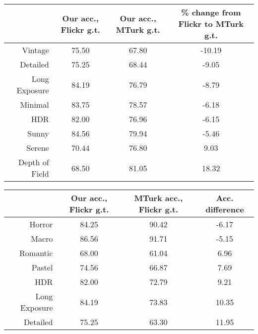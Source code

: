 \vfill

\begin{tabular}{rccc}
\toprule
{}                    & Our acc., Flickr g.t.   & Our acc., MTurk g.t.  & \% change from Flickr to MTurk g.t. \\
\midrule
Vintage               & 75.50                       & 67.80                     & -10.19 \\
Detailed              & 75.25                       & 68.44                     & -9.05 \\
Long Exposure         & 84.19                       & 76.79                     & -8.79 \\
Minimal               & 83.75                       & 78.57                     & -6.18 \\
HDR                   & 82.00                       & 76.96                     & -6.15 \\
Sunny                 & 84.56                       & 79.94                     & -5.46 \\
Serene                & 70.44                       & 76.80                     & 9.03 \\
Depth of Field        & 68.50                       & 81.05                     & 18.32 \\
\end{tabular}

\vfill

\begin{tabular}{rccc}
\toprule
{}                     & Our acc., Flickr g.t. & MTurk acc., Flickr g.t. & Acc. difference \\
\midrule
Horror                 & 84.25                     & 90.42                       & -6.17 \\
Macro                  & 86.56                     & 91.71                       & -5.15 \\
Romantic               & 68.00                     & 61.04                       & 6.96 \\
Pastel                 & 74.56                     & 66.87                       & 7.69 \\
HDR                    & 82.00                     & 72.79                       & 9.21 \\
Long Exposure          & 84.19                     & 73.83                       & 10.35 \\
Detailed               & 75.25                     & 63.30                       & 11.95 \\
\end{tabular}

